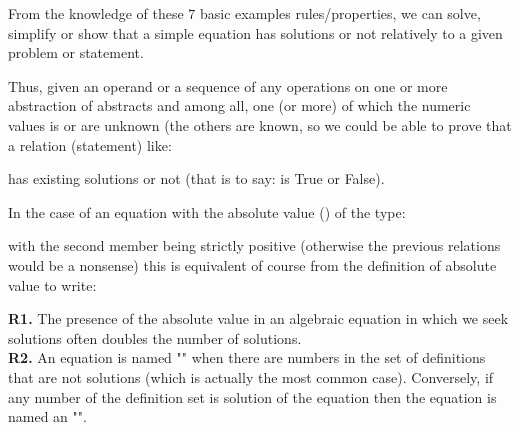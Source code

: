 	From the knowledge of these $7$ basic examples rules/properties, we can solve, simplify or show that a simple equation has solutions or not relatively to a given  problem or statement.

	Thus, given an operand or a sequence of any operations on one or more abstraction of abstracts and among all, one (or more) of which the numeric values is or are unknown (the others are known, so we could be able to prove that a relation (statement) like:
	
	has existing solutions or not (that is to say: is True or False).
	
In the case of an equation with the absolute value () of the type:
	
	with the second member being strictly positive (otherwise the previous relations would be a nonsense) this is equivalent  of course from the definition of absolute value to write:
	

	\begin{tcolorbox}[title=Remarks,colframe=black,arc=10pt]
	\textbf{R1.} The presence of the absolute value in an algebraic equation in which we seek solutions often doubles the number of solutions.\\
	
	\textbf{R2.} An equation is named "" when there are numbers in the set of definitions that are not solutions (which is actually the most common case). Conversely, if any number of the definition set is solution of the equation then the equation is named an "".
	\end{tcolorbox}	
	
